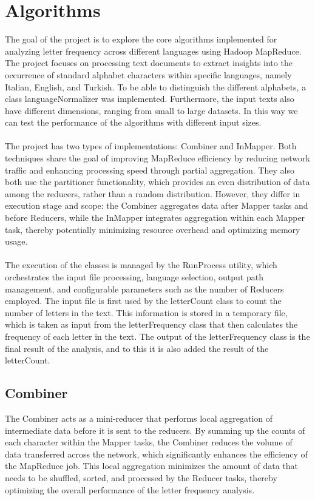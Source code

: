 \chapter{Algorithms}


The goal of the project is to explore the core algorithms implemented for analyzing letter frequency across different languages using Hadoop MapReduce. 
The project focuses on processing text documents to extract insights into the occurrence of standard alphabet characters within specific languages, namely Italian, English, and Turkish. 
To be able to distinguish the different alphabets, a class languageNormalizer was implemented. Furthermore, the input texts also have different
dimensions, ranging from small to large datasets. In this way we can test the performance of the algorithms with different input sizes. \\ \\
The project has two types of implementations: Combiner and InMapper. Both techniques share the goal of improving MapReduce efficiency by
reducing network traffic and enhancing processing speed through partial aggregation. They also both use the partitioner functionality,
which provides an even distribution of data among the reducers, rather than a random distribution. However, they differ in execution
stage and scope: the Combiner aggregates data after Mapper tasks and before Reducers, while the InMapper integrates aggregation within
each Mapper task, thereby potentially minimizing resource overhead and optimizing memory usage. \\ \\
The execution of the classes is managed by the RunProcess utility, which orchestrates the input file processing, language selection,
output path management, and configurable parameters such as the number of Reducers employed. The input file is first used by the
letterCount class to count the number of letters in the text. This information is stored in a temporary file, which is taken as input
from the letterFrequency class that then calculates the frequency of each letter in the text. The output of the letterFrequency class
is the final result of the analysis, and to this it is also added the result of the letterCount.

\section{Combiner}

The Combiner acts as a mini-reducer that performs local aggregation of intermediate data before it is sent to the reducers.
By summing up the counts of each character within the Mapper tasks, the Combiner reduces the volume of data transferred
across the network, which significantly enhances the efficiency of the MapReduce job. This local aggregation minimizes
the amount of data that needs to be shuffled, sorted, and processed by the Reducer tasks, thereby optimizing the overall
performance of the letter frequency analysis.

